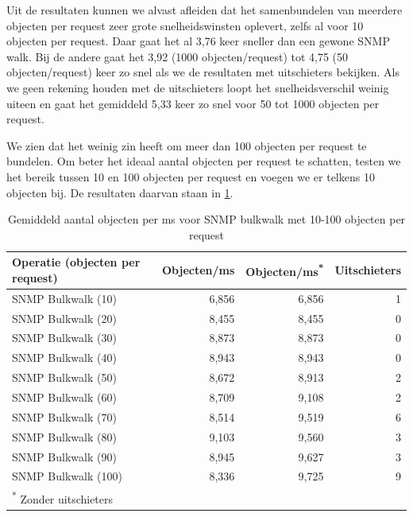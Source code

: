Uit de resultaten kunnen we alvast afleiden dat het samenbundelen van meerdere objecten per request zeer grote snelheidswinsten oplevert,
zelfs al voor 10 objecten per request.
Daar gaat het al 3,76 keer sneller dan een gewone SNMP walk.
Bij de andere gaat het 3,92 (1000 objecten/request) tot 4,75 (50 objecten/request) keer zo snel als we de resultaten met uitschieters bekijken.
Als we geen rekening houden met de uitschieters loopt het snelheidsverschil weinig uiteen en
gaat het gemiddeld 5,33 keer zo snel voor 50 tot 1000 objecten per request.

We zien dat het weinig zin heeft om meer dan 100 objecten per request te bundelen.
Om beter het ideaal aantal objecten per request te schatten, testen we het bereik tussen 10 en 100 objecten per request en voegen we er telkens 10 objecten bij.
De resultaten daarvan staan in \cref{tabel-bulkrequests-bulksizes}.

\begin{table}[h]
\centering
\begin{tabular}{@{}lrrr@{}}
\toprule
Operatie (objecten per request) & Objecten/ms & Objecten/ms\textsuperscript{*} & Uitschieters \\ \midrule
SNMP Bulkwalk (10)              & 6,856       & 6,856         & 1            \\
SNMP Bulkwalk (20)              & 8,455       & 8,455         & 0            \\
SNMP Bulkwalk (30)              & 8,873       & 8,873         & 0            \\
SNMP Bulkwalk (40)              & 8,943       & 8,943         & 0            \\
SNMP Bulkwalk (50)              & 8,672       & 8,913         & 2            \\
SNMP Bulkwalk (60)              & 8,709       & 9,108         & 2            \\
SNMP Bulkwalk (70)              & 8,514       & 9,519         & 6            \\
SNMP Bulkwalk (80)              & 9,103       & 9,560         & 3            \\
SNMP Bulkwalk (90)              & 8,945       & 9,627         & 3            \\
SNMP Bulkwalk (100)             & 8,336       & 9,725         & 9            \\ \midrule[.5pt]
\multicolumn{4}{l}{\textsuperscript{*} \footnotesize{Zonder uitschieters}}
\end{tabular}
\caption{Gemiddeld aantal objecten per ms voor SNMP bulkwalk met 10-100 objecten per request}
\label{tabel-bulkrequests-bulksizes}
\end{table}

